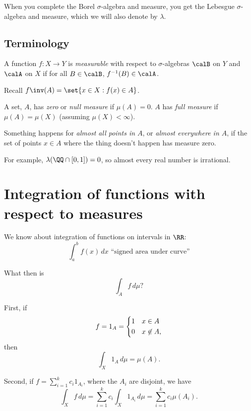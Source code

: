 \documentclass{article}
\begin{document}
When you complete the Borel $\sigma$-algebra and measure, 
you get the Lebesgue $\sigma$-algebra and measure, which we
will also denote by $\lambda$.

\subsection{Terminology}

\begin{definition}
    A function $f: X\to Y$ is \emph{measurable} with respect to 
    $\sigma$-algebras $\calB$ on $Y$ and $\calA$ on $X$ if 
    for all $B\in \calB$, $f^{-1}(B) \in \calA$.

    Recall $f\inv(A) = \set{x\in X: f(x) \in A}$.
\end{definition}

\begin{definition}
    A set, $A$, has \emph{zero} or \emph{null measure} if 
    $\mu(A)=0$. $A$ has \emph{full measure} if 
    $\mu(A)=\mu(X)$ (assuming $\mu(X) < \infty$).
\end{definition}

\begin{definition}
    Something happens for \emph{almost all points in $A$},
    or \emph{almost everywhere in $A$}, if the set of points
    $x\in A$ where the thing doesn't happen has measure zero.

    For example, $\lambda(\QQ\cap [0,1]) = 0$, so almost every 
    real number is irrational. 
\end{definition}

\section{Integration of functions with respect to measures}


We know about integration of functions on intervals in $\RR$:
\[ \int_a^b f(x)\,dx \text{ ``signed area under curve''}\]

What then is 
\[\int_A f\,d\mu? \]

First, if \[ f=1_A =
\begin{dcases} 1 & x\in A \\ 0&x\not\in A, \end{dcases} \]
then
\[ \int_X 1_A\,d\mu = \mu(A).\]

Second, if $f= \sum_{i=1}^k c_i 1_{A_i}$, where the $A_i$ are 
disjoint, we have
\[ \int_{X} f\,d\mu 
= \sum_{i=1}^k c_i \int_X 1_{A_i}\,d\mu
= \sum_{i=1}^k c_i\mu(A_i).\]
\end{document}
